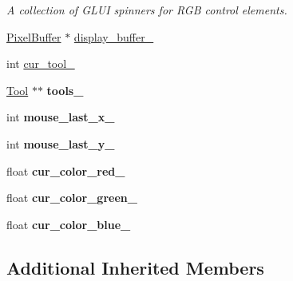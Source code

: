 \begin{DoxyCompactItemize}
\begin{tabbing}
\end{tabbing}\begin{DoxyCompactList}\small\item\em A collection of G\+L\+UI spinners for R\+GB control elements. \end{DoxyCompactList}\item 
\hyperlink{classimage__tools_1_1PixelBuffer}{Pixel\+Buffer} $\ast$ \hyperlink{classimage__tools_1_1FlashPhotoApp_ad0a08d5606cfc5aa02412303147c612d}{display\+\_\+buffer\+\_\+}
\item 
int \hyperlink{classimage__tools_1_1FlashPhotoApp_a1aa3a6b34a072dd47f6b7ab150a52710}{cur\+\_\+tool\+\_\+}
\item 
\hyperlink{classimage__tools_1_1Tool}{Tool} $\ast$$\ast$ {\bfseries tools\+\_\+}\hypertarget{classimage__tools_1_1FlashPhotoApp_afbf9034065490150ebbda3b18ed997b2}{}\label{classimage__tools_1_1FlashPhotoApp_afbf9034065490150ebbda3b18ed997b2}

\item 
int {\bfseries mouse\+\_\+last\+\_\+x\+\_\+}\hypertarget{classimage__tools_1_1FlashPhotoApp_a02008fe44be326994e7983982d5f8b58}{}\label{classimage__tools_1_1FlashPhotoApp_a02008fe44be326994e7983982d5f8b58}

\item 
int {\bfseries mouse\+\_\+last\+\_\+y\+\_\+}\hypertarget{classimage__tools_1_1FlashPhotoApp_abd546ebc214dea88be2768d78466711f}{}\label{classimage__tools_1_1FlashPhotoApp_abd546ebc214dea88be2768d78466711f}

\item 
float {\bfseries cur\+\_\+color\+\_\+red\+\_\+}\hypertarget{classimage__tools_1_1FlashPhotoApp_a1f05e2dcc771bb2b915fe5713cafd06c}{}\label{classimage__tools_1_1FlashPhotoApp_a1f05e2dcc771bb2b915fe5713cafd06c}

\item 
float {\bfseries cur\+\_\+color\+\_\+green\+\_\+}\hypertarget{classimage__tools_1_1FlashPhotoApp_a06056579211bf21a52db97fdd9cd1729}{}\label{classimage__tools_1_1FlashPhotoApp_a06056579211bf21a52db97fdd9cd1729}

\item 
float {\bfseries cur\+\_\+color\+\_\+blue\+\_\+}\hypertarget{classimage__tools_1_1FlashPhotoApp_a87cfd54779dd53c6f4fd387984251ebc}{}\label{classimage__tools_1_1FlashPhotoApp_a87cfd54779dd53c6f4fd387984251ebc}

\end{DoxyCompactItemize}
\subsection*{Additional Inherited Members}


